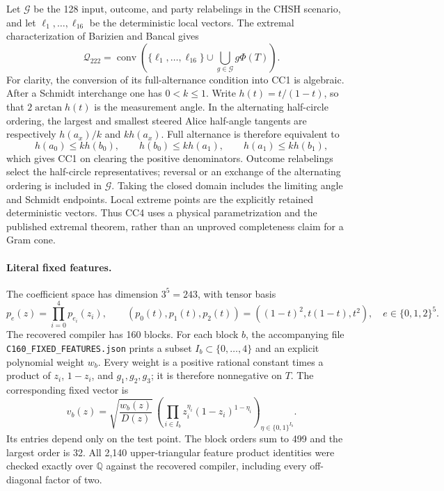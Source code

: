 Let $\mathcal G$ be the 128 input, outcome, and party relabelings in the
CHSH scenario, and let $\ell_1,\ldots,\ell_{16}$ be the deterministic
local vectors.  The extremal characterization of Barizien and Bancal
\cite{barizien_bancal} gives
\[
 \mathcal Q_{222}=\operatorname{conv}
 \left(\{\ell_1,\ldots,\ell_{16}\}\cup
       \bigcup_{g\in\mathcal G}g\Phi(T)\right).
\tag{CC4}
\]
For clarity, the conversion of its full-alternance condition into CC1
is algebraic.  After a Schmidt interchange one has $0<k\le1$.
Write $h(t)=t/(1-t)$, so that $2\arctan h(t)$ is the measurement
angle.  In the alternating half-circle ordering, the largest and
smallest steered Alice half-angle tangents are respectively
$h(a_x)/k$ and $kh(a_x)$.  Full alternance is therefore equivalent to
\[
 h(a_0)\le kh(b_0),\qquad h(b_0)\le kh(a_1),\qquad
 h(a_1)\le kh(b_1),
\]
which gives CC1 on clearing the positive denominators.  Outcome
relabelings select the half-circle representatives; reversal or an
exchange of the alternating ordering is included in $\mathcal G$.
Taking the closed domain includes the limiting angle and Schmidt
endpoints.  Local extreme points are the explicitly retained
deterministic vectors.  Thus CC4 uses a physical parametrization and
the published extremal theorem, rather than an unproved completeness
claim for a Gram cone.

\paragraph{Literal fixed features.}
The coefficient space has dimension $3^5=243$, with tensor basis
\[
 p_e(z)=\prod_{i=0}^4 p_{e_i}(z_i),\qquad
 (p_0(t),p_1(t),p_2(t))=((1-t)^2,t(1-t),t^2),
 \quad e\in\{0,1,2\}^5.
\tag{CC5}
\]
The recovered compiler has 160 blocks.  For each block $b$, the
accompanying file \nolinkurl{C160_FIXED_FEATURES.json} prints a subset
$I_b\subset\{0,\ldots,4\}$ and an explicit polynomial weight $w_b$.
Every weight is a positive rational constant times a product of
$z_i$, $1-z_i$, and $g_1,g_2,g_3$; it is therefore nonnegative on $T$.
The corresponding fixed vector is
\[
 v_b(z)=\sqrt{\frac{w_b(z)}{D(z)}}\,
       \left(\prod_{i\in I_b}z_i^{\eta_i}(1-z_i)^{1-\eta_i}
         \right)_{\eta\in\{0,1\}^{I_b}}.
\tag{CC6}
\]
Its entries depend only on the test point.  The block orders sum to
499 and the largest order is 32.  All 2,140 upper-triangular feature
product identities were checked exactly over $\mathbb Q$ against the
recovered compiler, including every off-diagonal factor of two.

